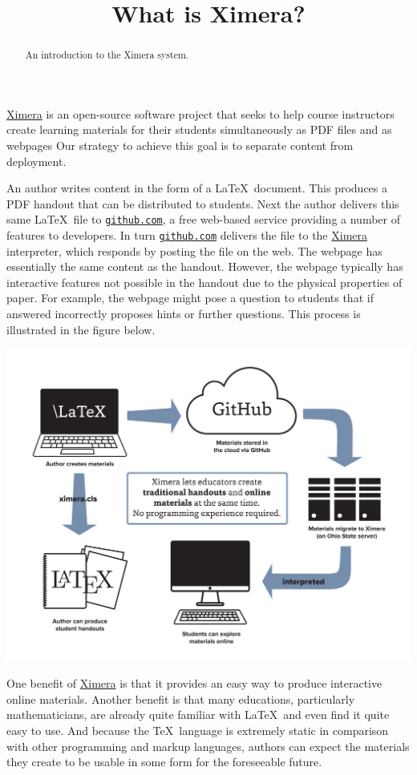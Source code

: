 \documentclass{ximera}
\title{What is Ximera?}
\begin{document}
\begin{abstract}
An introduction to the Ximera system.
\end{abstract}
\maketitle

\href{http://ximera.osu.edu}{\sf Ximera}
is an open-source software project that
seeks to help course instructors create learning materials
for their students simultaneously as PDF files and as webpages
Our strategy to achieve this goal is to separate
content from deployment.

An author writes content in the form of a \LaTeX\ document.
This produces a PDF handout that can be distributed to students.
Next the author delivers this same \LaTeX\ file to
\href{http://github.com}{\tt github.com},
a free web-based service providing a number of features to developers.
In turn \href{http://github.com}{\tt github.com} delivers
the file to the \href{http://ximera.osu.edu}{\sf Ximera}
interpreter, which responds by posting the file on the web.
The webpage has essentially the same content as the handout.
However, the webpage typically has interactive features
not possible in the handout due to the physical properties of paper.
For example, the webpage might pose a question to students
that if answered incorrectly proposes hints or further questions.
This process is illustrated in the figure below.

\begin{image}
\includegraphics[scale=.25]{XimeraGraphic.png}
\end{image}

One benefit of \href{http://ximera.osu.edu}{\sf Ximera}
is that it provides an easy way to produce interactive online materials.
Another benefit is that many educations, particularly mathematicians,
are already quite familiar with \LaTeX\ and
even find it quite easy to use.
And because the \TeX\ language is extremely static in comparison with
other programming and markup languages, authors can expect
the materials they create to be usable in some
form for the foreseeable future.
\end{document}
